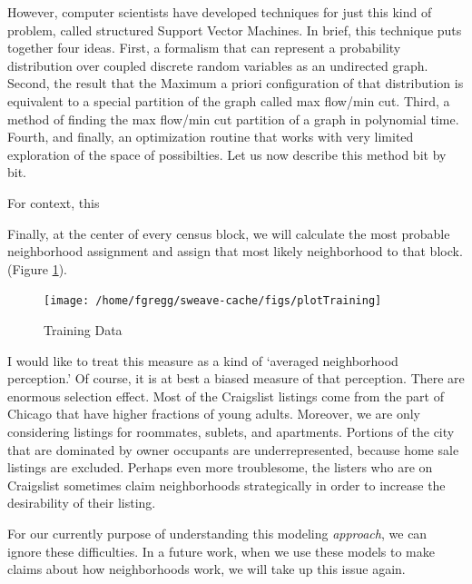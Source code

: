 \documentclass[12pt,letter]{article}\usepackage[]{graphicx}\usepackage[]{color}
\newenvironment{knitrout}{}{} %
\begin{document}
However, computer scientists have developed techniques for just this
kind of problem, called structured Support Vector Machines. In brief,
this technique puts together four ideas. First, a formalism that can
represent a probability distribution over coupled discrete random
variables as an undirected graph. Second, the result that the Maximum
a priori configuration of that distribution is equivalent to a special
partition of the graph called max flow/min cut. Third, a method of
finding the max flow/min cut partition of a graph in polynomial
time. Fourth, and finally, an optimization routine that works with
very limited exploration of the space of possibilties. Let us now
describe this method bit by bit.






For context, this 

Finally, at the center of every census block, we will calculate the most
probable neighborhood assignment and assign that most likely
neighborhood to that block. (Figure \ref{fig:training}).

\begin{figure}
\begin{knitrout}
\color{fgcolor}

{\centering \texttt{[image: /home/fgregg/sweave-cache/figs/plotTraining]} 

}



\end{knitrout}

\caption{Training Data}
\label{fig:training}
\end{figure}


I would like to treat this measure as a kind of `averaged neighborhood
perception.' Of course, it is at best a biased measure of that
perception. There are enormous selection effect. Most of the
Craigslist listings come from the part of Chicago that have higher
fractions of young adults. Moreover, we are only considering listings
for roommates, sublets, and apartments. Portions of the city that are
dominated by owner occupants are underrepresented, because home sale
listings are excluded. Perhaps even more troublesome, the listers who
are on Craigslist sometimes claim neighborhoods strategically in order
to increase the desirability of their listing.




For our currently purpose of understanding this modeling
\emph{approach}, we can ignore these difficulties. In a future work,
when we use these models to make claims about how neighborhoods work,
we will take up this issue again.
\end{document}
